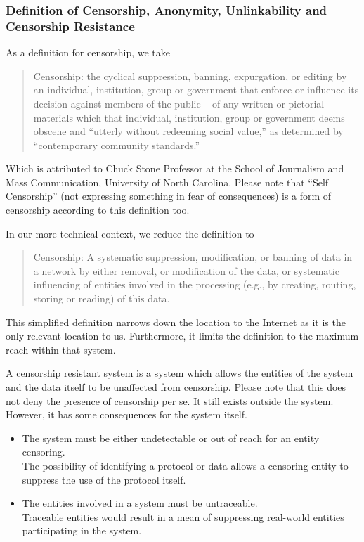 \documentclass[10pt,journal,compsoc]{IEEEtran}
\begin{document}
\subsubsection{Definition of Censorship, Anonymity, Unlinkability and Censorship Resistance}
As a definition for censorship, we take
\begin{quote}
	Censorship: the cyclical suppression, banning, expurgation, or editing by an individual, institution, group or government that enforce or influence its decision against members of the public -- of any written or pictorial materials which that individual, institution, group or government deems obscene and ``utterly without redeeming social value,'' as determined by ``contemporary community standards.''
\end{quote}

Which is attributed to Chuck Stone Professor at the School of Journalism and Mass Communication, University of North Carolina. Please note that ``Self Censorship'' (not expressing something in fear of consequences)  is a form of censorship according to this definition too.

In our more technical context, we reduce the definition to
\begin{quote}
	Censorship: A systematic suppression, modification, or banning of data in a network by either removal, or modification of the data, or systematic influencing of entities involved in the processing (e.g., by creating, routing, storing or reading) of this data.
\end{quote}
This simplified definition narrows down the location to the Internet as it is the only relevant location to us.  Furthermore, it limits the definition to the maximum reach within that system.

A censorship resistant system is a system which allows the entities of the system and the data itself to be unaffected from censorship. Please note that this does not deny the presence of censorship per se. It still exists outside the system. However, it has some consequences for the system itself.

\begin{itemize}
	\item The system must be either undetectable or out of reach for an entity censoring.\\
	The possibility of identifying a protocol or data allows a censoring entity to suppress the use of the protocol itself. 
	\item The entities involved in a system must be untraceable.\\
	Traceable entities would result in a mean of suppressing real-world entities participating in the system.
\end{itemize}
\end{document}
